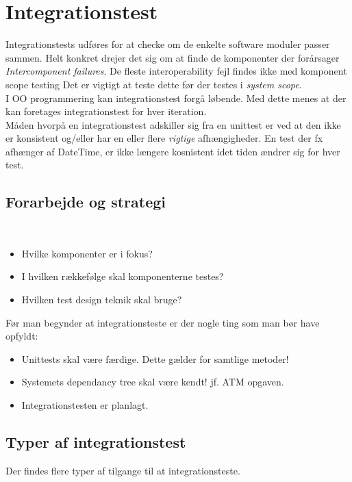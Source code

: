 \section{Integrationstest}
Integrationstests udføres for at checke om de enkelte software moduler passer sammen. Helt konkret drejer det sig om at finde de komponenter der forårsager \textit{Intercomponent failures}. De fleste interoperability fejl findes ikke med komponent scope testing Det er vigtigt at teste dette før der testes i \textit{system scope}.\\

I OO programmering kan integrationstest forgå løbende. Med dette menes at der kan foretages integrationstest for hver iteration. \\

Måden hvorpå en integrationstest adskiller sig fra en unittest er ved at den ikke er konsistent og/eller har en eller flere \textit{rigtige} afhængigheder. En test der fx afhænger af DateTime, er ikke længere kosnistent idet tiden ændrer sig for hver test.

\subsection{Forarbejde og strategi}\\

\begin{itemize}
	\item Hvilke komponenter er i fokus?
	\item I hvilken rækkefølge skal komponenterne testes?
	\item Hvilken test design teknik skal bruge?
\end{itemize}

Før man begynder at integrationsteste er der nogle ting som man bør have opfyldt:

\begin{itemize}
	\item Unittests skal være færdige. Dette gælder for samtlige metoder!
	\item Systemets dependancy tree skal være kendt! jf. ATM opgaven.
	\item Integrationstesten er planlagt.
\end{itemize}

\subsection{Typer af integrationstest}
Der findes flere typer af tilgange til at integrationsteste.

